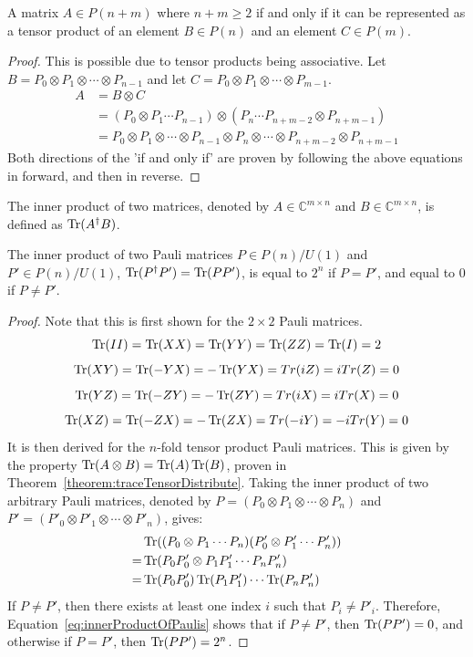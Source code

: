 \begin{theorem}
\label{theoremPauli}
A matrix $A \in P(n + m)$ where $n + m \geq 2$ if and only if it can be represented as a tensor product of an element $B \in P(n)$ and an element $C \in P(m)$.
\end{theorem}
\begin{proof}
This is possible due to tensor products being associative. Let $B = P_0 \otimes P_1 \otimes \cdots \otimes P_{n-1}$ and let $C =  P_0 \otimes P_1 \otimes \cdots \otimes P_{m-1}$.
\begin{align}
A &=B \otimes C \\
&= (P_0 \otimes P_1 \cdots P_{n-1}) \otimes (P_{n} \cdots P_{n+m-2} \otimes P_{n+m-1}) \\
&= P_0 \otimes P_1 \otimes \cdots \otimes P_{n-1} \otimes P_n \otimes \cdots \otimes P_{n+m-2} \otimes P_{n+m-1}
\end{align}
Both directions of the 'if and only if' are proven by following the above equations in forward, and then in reverse.
\end{proof}

The inner product of two matrices, denoted by $A \in \mathbb{C}^{m \times n}$ and $B \in \mathbb{C}^{m \times n}$, is defined as $\operatorname{Tr} (A^{\dagger} B)$.

\begin{theorem}
\label{theorem:innerProductPaulis}
The inner product of two Pauli matrices $P \in P(n) / U(1)$ and $P' \in P(n) / U(1)$, $\operatorname{Tr} (P^{\dagger} P') = \operatorname{Tr} (P P')$, is equal to $2^n$ if $P = P'$, and equal to $0$ if $P\neq P'$.
\end{theorem}
\begin{proof}
Note that this is first shown for the $2\times 2$ Pauli matrices.
$$
\operatorname{Tr}(II) = \operatorname{Tr}(XX) = \operatorname{Tr}(YY) = \operatorname{Tr}(ZZ) = \operatorname{Tr}(I) = 2
$$
$$
\operatorname{Tr}(XY) = \operatorname{Tr}(-YX) = -\operatorname{Tr}(YX) = Tr(iZ) = iTr(Z) = 0
$$
$$
\operatorname{Tr}(YZ) = \operatorname{Tr}(-ZY) = -\operatorname{Tr}(ZY) = Tr(iX) = iTr(X) = 0
$$
$$
\operatorname{Tr}(XZ) = \operatorname{Tr}(-ZX) = -\operatorname{Tr}(ZX) = Tr(-iY) = -iTr(Y) = 0
$$
It is then derived for the $n$-fold tensor product Pauli matrices. This is given by the property $\operatorname{Tr}(A \otimes B) = \operatorname{Tr}(A)\operatorname{Tr}(B)$, proven in Theorem~\ref{theorem:traceTensorDistribute}. Taking the inner product of two arbitrary Pauli matrices, denoted by $P = (P_0 \otimes P_1 \otimes \cdots \otimes P_n)$ and $P' = (P'_0 \otimes P'_1 \otimes \cdots \otimes P'_n)$, gives:
\begin{align}
&\operatorname{Tr}((P_0 \otimes P_1 \cdots P_n)(P'_0 \otimes P'_1 \cdots P'_n))\\
=&\operatorname{Tr}(P_0P'_0 \otimes P_1P'_1 \cdots P_nP'_n)\\
=&\operatorname{Tr}(P_0P'_0)\operatorname{Tr}(P_1P'_1) \cdots \operatorname{Tr}(P_nP'_n) \label{eq:innerProductOfPaulis}
\end{align}
If $P \neq P'$, then there exists at least one index $i$ such that $P_i \neq P'_i$. Therefore, Equation~\eqref{eq:innerProductOfPaulis} shows that if $P \neq P'$, then $\operatorname{Tr}(PP') = 0$, and otherwise if $P = P'$, then $\operatorname{Tr}(PP') = 2^n$.
\end{proof}

